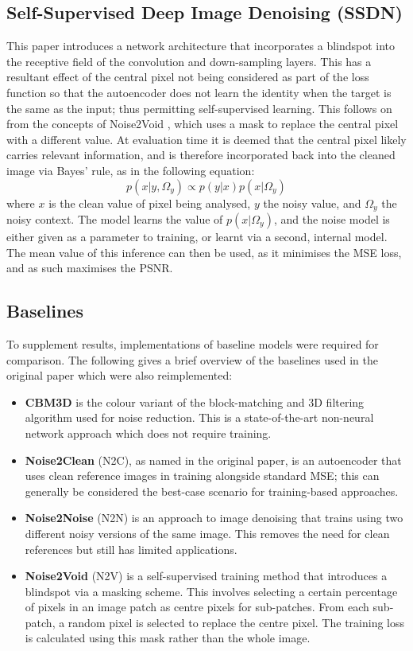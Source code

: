 \documentclass{article} %
\begin{document}
\subsection{Self-Supervised Deep Image Denoising (SSDN)}
This paper introduces a network architecture that incorporates a blindspot into the receptive field of the convolution and down-sampling layers. This has a resultant effect of the central pixel not being considered as part of the loss function so that the autoencoder does not learn the identity when the target is the same as the input; thus permitting self-supervised learning. This follows on from the concepts of Noise2Void \citep{noise2void}, which uses a mask to replace the central pixel with a different value. At evaluation time it is deemed that the central pixel likely carries relevant information, and is therefore incorporated back into the cleaned image via Bayes' rule, as in the following equation:
\[p(x|y, \Omega_{y}) \propto p(y|x) p(x|\Omega_{y})\]
where $x$ is the clean value of pixel being analysed, $y$ the noisy value, and $\Omega_{y}$ the noisy context. The model learns the value of $p(x|\Omega_{y})$, and the noise model is either given as a parameter to training, or learnt via a second, internal model. The mean value of this inference can then be used, as it minimises the MSE loss, and as such maximises the PSNR.

\subsection{Baselines}
To supplement results, implementations of baseline models were required for comparison. The following gives a brief overview of the baselines used in the original paper which were also reimplemented:
\begin{itemize}
\item \textbf{CBM3D} \citep{cbm3d} is the colour variant of the block-matching and 3D filtering algorithm used for noise reduction. This is a state-of-the-art non-neural network approach which does not require training.

\item \textbf{Noise2Clean} (N2C), as named in the original paper, is an autoencoder that uses clean reference images in training alongside standard MSE; this can generally be considered the best-case scenario for training-based approaches.

\item \textbf{Noise2Noise} (N2N) \citep{noise2noise} is an approach to image denoising that trains using two different noisy versions of the same image. This removes the need for clean references but still has limited applications.

\item \textbf{Noise2Void} (N2V)  \citep{noise2void} is a self-supervised training method that introduces a blindspot via a masking scheme. This involves selecting a certain percentage of pixels in an image patch as centre pixels for sub-patches. From each sub-patch, a random pixel is selected to replace the centre pixel. The training loss is calculated using this mask rather than the whole image.

\end{itemize}
\end{document}
